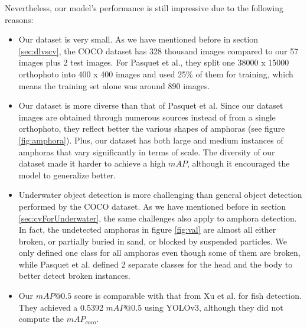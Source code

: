 \documentclass[a4paper, 11pt, oneside]{article}
\begin{document}
Nevertheless, our model's performance is still impressive due to the following reasons:

\begin{itemize}
  \item Our dataset is very small. As we have mentioned before in section \ref{sec:dlvscv}, the COCO dataset has 328
  thousand images compared to our 57 images plus 2 test images. For Pasquet et al., they split one 38000 x 15000
  orthophoto into 400 x 400 images and used 25\% of them for training, which means the training set alone was around
  890 images.
  \item Our dataset is more diverse than that of Pasquet et al. Since our dataset images are obtained through
  numerous sources instead of from a single orthophoto, they reflect better the various shapes of amphoras (see
  figure \ref{fig:amphora}). Plus, our dataset has both large and medium instances of amphoras that vary significantly
  in terms of scale. The diversity of our dataset made it harder to achieve a high $mAP$, although it encouraged
  the model to generalize better.
  \item Underwater object detection is more challenging than general object detection performed by the COCO dataset.
  As we have mentioned before in section \ref{sec:cvForUnderwater}, the same challenges also apply to amphora
  detection. In fact, the undetected amphoras in figure \ref{fig:val} are almost all either broken, or partially buried
  in sand, or blocked by suspended particles. We only defined one class for all amphoras even though some of them are
  broken, while Pasquet et al. defined 2 separate classes for the head and the body to better detect broken instances.
  \item Our $mAP@0.5$ score is comparable with that from Xu et al. \cite{xu2018underwater} for fish detection. They
  achieved a 0.5392 $mAP@0.5$ using YOLOv3, although they did not compute the $mAP_{coco}$.
\end{itemize}
\end{document}
